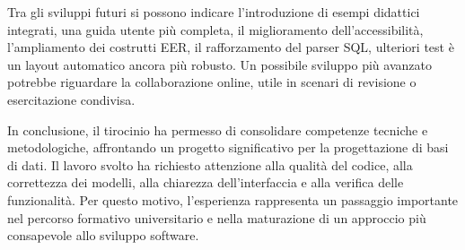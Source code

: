 \documentclass{unipd-thesis-modern}
\begin{document}
Tra gli sviluppi futuri si possono indicare l'introduzione di esempi didattici integrati, una guida utente più completa, il miglioramento dell'accessibilità, l'ampliamento dei costrutti EER, il rafforzamento del parser SQL, ulteriori test è un layout automatico ancora più robusto. Un possibile sviluppo più avanzato potrebbe riguardare la collaborazione online, utile in scenari di revisione o esercitazione condivisa.

In conclusione, il tirocinio ha permesso di consolidare competenze tecniche e metodologiche, affrontando un progetto significativo per la progettazione di basi di dati. Il lavoro svolto ha richiesto attenzione alla qualità del codice, alla correttezza dei modelli, alla chiarezza dell'interfaccia e alla verifica delle funzionalità. Per questo motivo, l'esperienza rappresenta un passaggio importante nel percorso formativo universitario e nella maturazione di un approccio più consapevole allo sviluppo software.

\nocite{chen1976er}
\nocite{elmasri_navath_database}
\nocite{react_docs}
\nocite{typescript_docs}
\nocite{vite_docs}
\nocite{playwright_docs}

\cleardoublepage
{}
\printbibliography[heading=bibintoc,title={Bibliografia e sitografia}]
\end{document}
